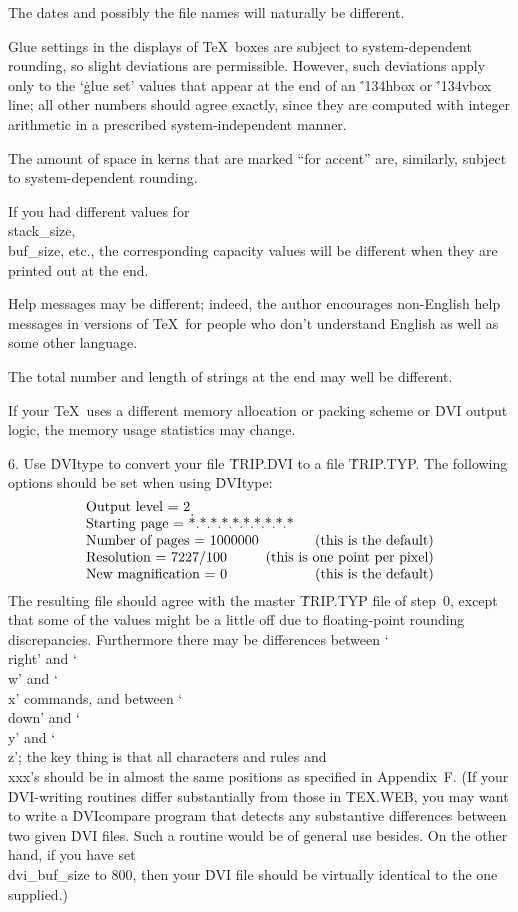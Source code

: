  The dates and possibly the file names will
naturally be different.

 Glue settings in the displays of \TeX\ boxes are subject
to system-dependent rounding, so slight deviations are permissible. However,
such deviations apply only to the `\.{glue set}' values that appear at the
end of an \.{\char'134hbox} or \.{\char'134vbox} line;
all other numbers should agree exactly, since they are computed with
integer arithmetic in a prescribed system-independent manner.

 The amount of space in kerns that are marked ``for accent''
are, similarly, subject to system-dependent rounding.

 If you had different values for \\{stack\_size}, \\{buf\_size},
etc., the corresponding capacity values will be different when they
are printed out at the end.

 Help messages may be different; indeed, the author encourages
non-English help messages in versions of \TeX\ for people who don't
understand English as well as some other language.

 The total number and length of strings at the end may well
be different.

 If your \TeX\ uses a different memory allocation or
packing scheme or \.{DVI} output logic, the memory usage statistics may change.

\item{6.} Use \.{DVItype} to convert your file \.{TRIP.DVI} to a file
\.{TRIP.TYP}. The following options should be set when using \.{DVItype}:
$$\vbox{\halign{#\hfil&\hfil#\cr
Output level = 2\cr
Starting page = \.{*.*.*.*.*.*.*.*.*.*}\hskip-20pt\cr
Number of pages = 1000000&(this is the default)\cr
Resolution = 7227/100&(this is one point per pixel)\cr
New magnification = 0&(this is the default)\cr}}$$
The resulting file should agree with the master \.{TRIP.TYP} file of step~0,
except that some of the values might be a little off due to floating-point
rounding discrepancies. Furthermore there may be differences between
`\\{right}' and `\\w' and `\\x' commands, and between `\\{down}' and `\\y'
and `\\z'; the key thing is that all characters and rules and \\{xxx}'s should
be in almost the same positions as specified in Appendix~F.
(If your \.{DVI}-writing routines differ substantially from those in
\.{TEX.WEB}, you may want to write a \.{DVIcompare} program that
detects any substantive differences between two given \.{DVI} files. Such
a routine would be of general use besides.
On the other hand, if you have set \\{dvi\_buf\_size} to 800, then your
\.{DVI} file should be virtually identical to the one supplied.)

